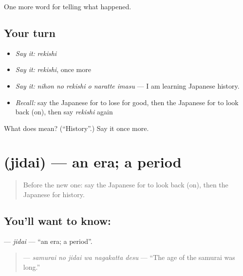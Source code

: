 \begin{grammarlens}[title={What you've built}]
One more word for telling what happened.
\end{grammarlens}

\subsection*{Your turn}
\begin{itemize}
\raggedright
  \item \emph{Say it:} \emph{rekishi}
  \item \emph{Say it:} \emph{rekishi}, once more
  \item \emph{Say it:} \emph{nihon no rekishi o naratte imasu} — I am learning Japanese history.
  \item \emph{Recall:} say the Japanese for to lose for good, then the Japanese for to look back (on), then say \emph{rekishi} again
\end{itemize}

\begin{tcolorbox}[breakable,colback=teal!4,colframe=teal!35!black,title={Before you move on}]
What does  mean? (\textquotedblleft{}History\textquotedblright{}.) Say it once more.
\end{tcolorbox}
\section[\texorpdfstring{\ja{じだい} (jidai)}{じだい (jidai)}]{ (jidai) — an era; a period}

\label{lesson:JA-C312-jidai}



\begin{quote}
Before the new one: say the Japanese for to look back (on), then the Japanese for history.
\end{quote}

\subsection*{You'll want to know: }
\textbf{} — \emph{jidai} — \textquotedblleft{}an era; a period\textquotedblright{}.

\begin{quote}
\textbf{  } — \emph{samurai no jidai wa nagakatta desu} — \textquotedblleft{}The age of the samurai was long.\textquotedblright{}
\end{quote}


